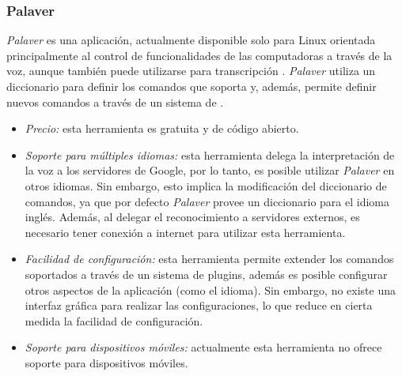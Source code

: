 \subsubsection{Palaver}
\label{sec:palaver}

\emph{Palaver} es una aplicaci\'on, actualmente disponible solo para Linux orientada principalmente
al control de funcionalidades de las computadoras a trav\'es de la voz, aunque tambi\'en
puede utilizarse para transcripci\'on \cite{Palaver}. \emph{Palaver} utiliza un diccionario para
definir los comandos que soporta y, adem\'as, permite definir nuevos comandos a trav\'es
de un sistema de .

\begin{itemize}
    \item \emph{Precio:} esta herramienta es gratuita y de c\'odigo abierto.
    \item \emph{Soporte para m\'ultiples idiomas:} esta herramienta delega la interpretaci\'on de
	la voz a los servidores de Google, por lo tanto, es posible utilizar \emph{Palaver} en otros idiomas.
    Sin embargo, esto implica la modificaci\'on del diccionario de comandos, ya que por 
    defecto \emph{Palaver} provee un diccionario para el idioma ingl\'es. Adem\'as, al delegar el
    reconocimiento a servidores externos, es necesario tener conexi\'on a internet para utilizar
    esta herramienta.
    \item \emph{Facilidad de configuraci\'on:} esta herramienta permite extender los comandos soportados a 
    trav\'es de un sistema de plugins, adem\'as es posible configurar otros aspectos de la aplicaci\'on
    (como el idioma). 
    Sin embargo, no existe una interfaz gr\'afica para realizar las configuraciones, lo que reduce en
    cierta medida la facilidad de configuraci\'on.
    \item \emph{Soporte para dispositivos m\'oviles:} actualmente esta herramienta no ofrece soporte
    para dispositivos m\'oviles.
\end{itemize}
